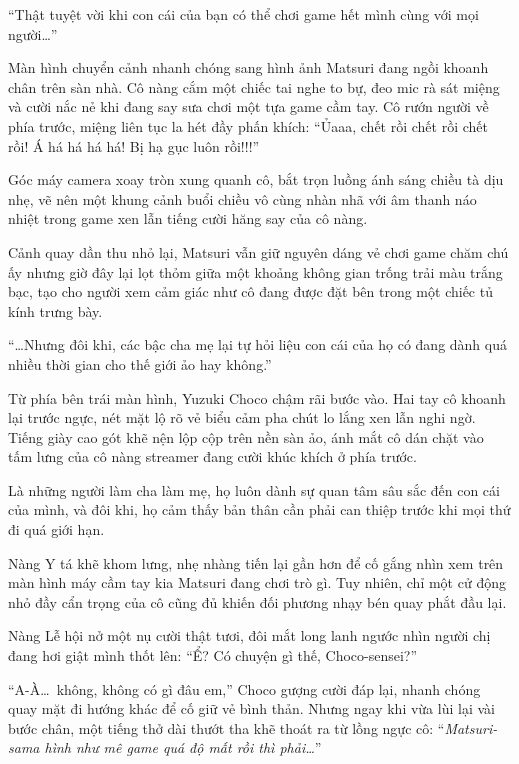 \documentclass[../main.tex]{subfiles}
\begin{document}
\begin{center}
  ``Thật tuyệt vời khi con cái của bạn có thể chơi game hết mình cùng với mọi người\dots''
\end{center}

Màn hình chuyển cảnh nhanh chóng sang hình ảnh Matsuri đang ngồi khoanh chân trên sàn nhà. Cô nàng cắm một chiếc tai nghe to bự, đeo mic rà sát miệng và cười nắc nẻ khi đang say sưa chơi một tựa game cầm tay. Cô rướn người về phía trước, miệng liên tục la hét đầy phấn khích: ``Ủaaa, chết rồi chết rồi chết rồi! Á há há há há! Bị hạ gục luôn rồi!!!''

Góc máy camera xoay tròn xung quanh cô, bắt trọn luồng ánh sáng chiều tà dịu nhẹ, vẽ nên một khung cảnh buổi chiều vô cùng nhàn nhã với âm thanh náo nhiệt trong game xen lẫn tiếng cười hăng say của cô nàng.

Cảnh quay dần thu nhỏ lại, Matsuri vẫn giữ nguyên dáng vẻ chơi game chăm chú ấy nhưng giờ đây lại lọt thỏm giữa một khoảng không gian trống trải màu trắng bạc, tạo cho người xem cảm giác như cô đang được đặt bên trong một chiếc tủ kính trưng bày.

\begin{center}
  ``\dots Nhưng đôi khi, các bậc cha mẹ lại tự hỏi liệu con cái của họ có đang dành quá nhiều thời gian cho thế giới ảo hay không.''
\end{center}

Từ phía bên trái màn hình, Yuzuki Choco chậm rãi bước vào. Hai tay cô khoanh lại trước ngực, nét mặt lộ rõ vẻ biểu cảm pha chút lo lắng xen lẫn nghi ngờ. Tiếng giày cao gót khẽ nện lộp cộp trên nền sàn ảo, ánh mắt cô dán chặt vào tấm lưng của cô nàng streamer đang cười khúc khích ở phía trước.


Là những người làm cha làm mẹ, họ luôn dành sự quan tâm sâu sắc đến con cái của mình, và đôi khi, họ cảm thấy bản thân cần phải can thiệp trước khi mọi thứ đi quá giới hạn.

Nàng Y tá khẽ khom lưng, nhẹ nhàng tiến lại gần hơn để cố gắng nhìn xem trên màn hình máy cầm tay kia Matsuri đang chơi trò gì. Tuy nhiên, chỉ một cử động nhỏ đầy cẩn trọng của cô cũng đủ khiến đối phương nhạy bén quay phắt đầu lại.

Nàng Lễ hội nở một nụ cười thật tươi, đôi mắt long lanh ngước nhìn người chị đang hơi giật mình thốt lên: ``Ể? Có chuyện gì thế, Choco-sensei?''

``A-À\dots\ không, không có gì đâu em,'' Choco gượng cười đáp lại, nhanh chóng quay mặt đi hướng khác để cố giữ vẻ bình thản. Nhưng ngay khi vừa lùi lại vài bước chân, một tiếng thở dài thướt tha khẽ thoát ra từ lồng ngực cô: ``\textit{Matsuri-sama hình như mê game quá độ mất rồi thì phải\dots}''
\end{document}
